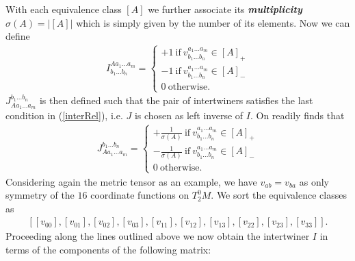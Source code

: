 \documentclass[a4paper,12pt, DIV=14, BCOR=5mm, twoside, headsepline]{scrbook}
\begin{document}
With each equivalence class $[A]$ we further associate its \textbf{\textit{multiplicity}} $\sigma(A) = \vert [A] \vert$ which is simply given by the number of its elements.
Now we can define
\begin{align}\label{defI}
    I^{A a_1 ... a_m}_{b_1 ... b_n} = \begin{cases} +1 \ \text{if} \  v^{a_1 ... a_m}_{b_1 ... b_n} \in [A]_+ \\
    -1 \ \text{if} \  v^{a_1 ... a_m}_{b_1 ... b_n} \in [A]_-  \\
                       0 \  \text{otherwise}.
                            \end{cases}
\end{align}
$J^{b_1 ... b_n}_{A a_1 ... a_m}$ is then defined such that the pair of intertwiners satisfies the last condition in (\ref{interRel}), i.e. $J$ is chosen as left inverse of $I$. On readily finds that
\begin{align}\label{defJ}
    J^{b_1 ... b_n}_{A a_1 ... a_m} = \begin{cases}  +\frac{1}{\sigma(A)} \  \text{if} \  v^{a_1 ... a_m}_{b_1 ... b_n} \in [A]_+\\
    -\frac{1}{\sigma(A)} \  \text{if} \  v^{a_1 ... a_m}_{b_1 ... b_n} \in [A]_- \\ 
    0   \ \text{otherwise}.
    \end{cases}
\end{align}
Considering again the metric tensor as an example, we have $v_{ab} = v_{ba}$ as only symmetry of the $16$ coordinate functions on $T^0_2M$. We sort the equivalence classes as 
\begin{align}
    \left[[v_{00}], [v_{01}], [v_{02}], [v_{03}], [v_{11}], [v_{12}], [v_{13}], [v_{22}], [v_{23}], [v_{33}]\right ].
\end{align}
Proceeding along the lines outlined above we now obtain the intertwiner $I$ in terms of the components of the following matrix: 
\end{document}
